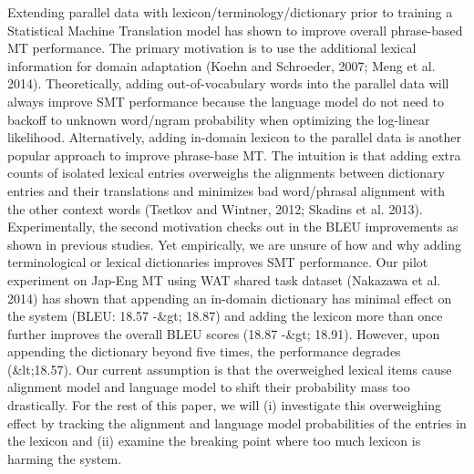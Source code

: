 \documentclass[10pt, a4paper, twopage, headinclude, footinclude, BCOR5mm]{book}
\begin{document}
\begin{table}[t!]
\end{table} 
\begin{table}[t!]
\end{table} 
\noindent
Extending parallel data with lexicon/terminology/dictionary prior to training a Statistical Machine Translation model has shown to improve overall phrase-based MT performance. The primary motivation is to use the additional lexical information for domain adaptation (Koehn and Schroeder, 2007; Meng et al. 2014). Theoretically, adding out-of-vocabulary words into the parallel data will always improve SMT performance because the language model do not need to backoff to unknown word/ngram probability when optimizing the log-linear likelihood.  Alternatively, adding in-domain lexicon to the parallel data is another popular approach to improve phrase-base MT. The intuition is that adding extra counts of isolated lexical entries overweighs the alignments between dictionary entries and their translations and minimizes bad word/phrasal alignment with the other context words (Tsetkov and Wintner, 2012; Skadins et al. 2013). Experimentally, the second motivation checks out in the BLEU improvements as shown in previous studies. Yet empirically, we are unsure of how and why adding terminological or lexical dictionaries improves SMT performance.  Our pilot experiment on Jap-Eng MT using WAT shared task dataset (Nakazawa et al. 2014) has shown that appending an in-domain dictionary has minimal effect on the system (BLEU: 18.57 -\&gt; 18.87) and adding the lexicon more than once further improves the overall BLEU scores (18.87 -\&gt; 18.91). However, upon appending the dictionary beyond five times, the performance degrades (\&lt;18.57). Our current assumption is that the overweighed lexical items cause alignment model and language model to shift their probability mass too drastically. For the rest of this paper, we will (i) investigate this overweighing effect by tracking the alignment and language model probabilities of the entries in the lexicon and (ii) examine the breaking point where too much lexicon is harming the system.    
\end{document}

